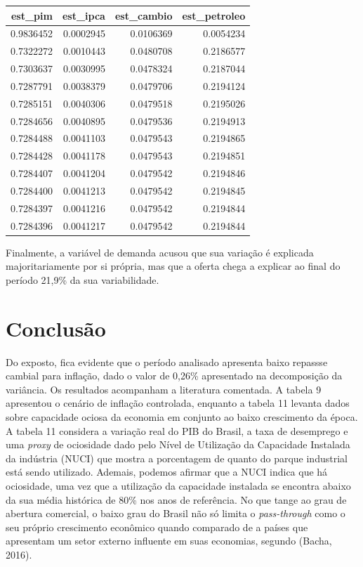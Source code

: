 \documentclass[12pt]{article}
\begin{document}
\begin{longtable}[]{@{}rrrr@{}}
\toprule
est\_pim & est\_ipca & est\_cambio & est\_petroleo \\
\midrule
\endhead
0.9836452 & 0.0002945 & 0.0106369 & 0.0054234 \\
0.7322272 & 0.0010443 & 0.0480708 & 0.2186577 \\
0.7303637 & 0.0030995 & 0.0478324 & 0.2187044 \\
0.7287791 & 0.0038379 & 0.0479706 & 0.2194124 \\
0.7285151 & 0.0040306 & 0.0479518 & 0.2195026 \\
0.7284656 & 0.0040895 & 0.0479536 & 0.2194913 \\
0.7284488 & 0.0041103 & 0.0479543 & 0.2194865 \\
0.7284428 & 0.0041178 & 0.0479543 & 0.2194851 \\
0.7284407 & 0.0041204 & 0.0479542 & 0.2194846 \\
0.7284400 & 0.0041213 & 0.0479542 & 0.2194845 \\
0.7284397 & 0.0041216 & 0.0479542 & 0.2194844 \\
0.7284396 & 0.0041217 & 0.0479542 & 0.2194844 \\
\bottomrule
\end{longtable}

Finalmente, a variável de demanda acusou que sua variação é explicada
majoritariamente por si própria, mas que a oferta chega a explicar ao
final do período 21,9\% da sua variabilidade.

\hypertarget{conclusuxe3o}{%
\section{Conclusão}\label{conclusuxe3o}}

Do exposto, fica evidente que o período analisado apresenta baixo
repassse cambial para inflação, dado o valor de 0,26\% apresentado na
decomposição da variância. Os resultados acompanham a literatura
comentada. A tabela 9 apresentou o cenário de inflação controlada,
enquanto a tabela 11 levanta dados sobre capacidade ociosa da economia
em conjunto ao baixo crescimento da época. A tabela 11 considera a
variação real do PIB do Brasil, a taxa de desemprego e uma \emph{proxy}
de ociosidade dado pelo Nível de Utilização da Capacidade Instalada da
indústria (NUCI) que mostra a porcentagem de quanto do parque industrial
está sendo utilizado. Ademais, podemos afirmar que a NUCI indica que há
ociosidade, uma vez que a utilização da capacidade instalada se encontra
abaixo da sua média histórica de 80\% nos anos de referência. No que
tange ao grau de abertura comercial, o baixo grau do Brasil não só
limita o \emph{pass-through} como o seu próprio crescimento econômico
quando comparado de a países que apresentam um setor externo influente
em suas economias, segundo (Bacha, 2016).
\end{document}
